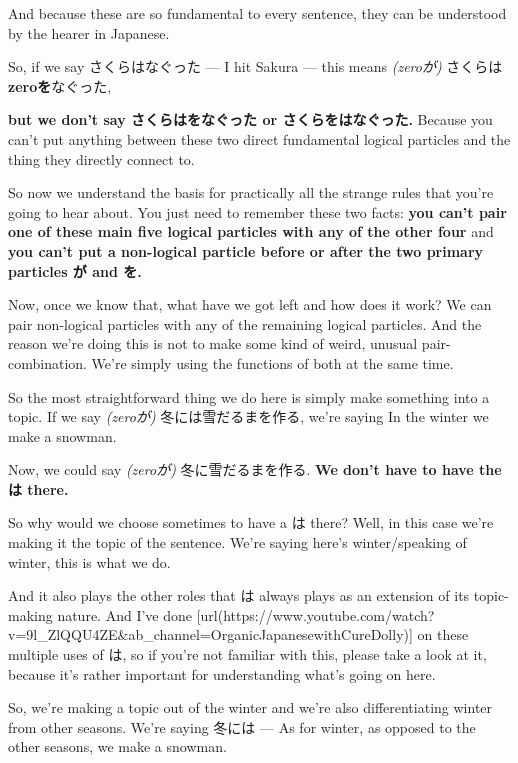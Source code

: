 And because these are so fundamental to every sentence, they can be understood by the hearer in Japanese.

So, if we say さくらはなぐった --- I hit Sakura --- this means {\em (zeroが)} さくらは{\bf zeroを}なぐった,

{}

{\bf but we don't say さくらはをなぐった or さくらをはなぐった.} Because you can't put anything between these two direct fundamental logical particles and the thing they directly connect to.

So now we understand the basis for practically all the strange rules that you're going to hear about. You just need to remember these two facts: {\bf you can't pair one of these main five logical particles with any of the other four} and {\bf you can't put a non-logical particle before or after the two primary particles が and を.}

Now, once we know that, what have we got left and how does it work? We can pair non-logical particles with any of the remaining logical particles. And the reason we're doing this is not to make some kind of weird, unusual pair-combination. We're simply using the functions of both at the same time.

So the most straightforward thing we do here is simply make something into a topic. If we say {\em (zeroが)} 冬には雪だるまを作る, we're saying In the winter we make a snowman.

{}

Now, we could say {\em (zeroが)} 冬に雪だるまを作る. {\bf We don't have to have the は there.}

So why would we choose sometimes to have a は there? Well, in this case we're making it the topic of the sentence. We're saying here's winter/speaking of winter, this is what we do.

And it also plays the other roles that は always plays as an extension of its topic-making nature. And I've done [url(https://www.youtube.com/watch?v=9l_ZlQQU4ZE&ab_channel=OrganicJapanesewithCureDolly)] on these multiple uses of は, so if you're not familiar with this, please take a look at it, because it's rather important for understanding what's going on here.

So, we're making a topic out of the winter and we're also differentiating winter from other seasons. We're saying 冬には --- As for winter, as opposed to the other seasons, we make a snowman.

